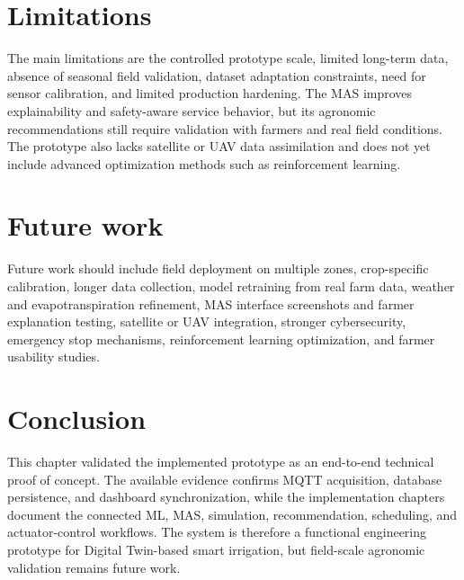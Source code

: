 \section{Limitations}

The main limitations are the controlled prototype scale, limited long-term data, absence of seasonal field validation, dataset adaptation constraints, need for sensor calibration, and limited production hardening. The MAS improves explainability and safety-aware service behavior, but its agronomic recommendations still require validation with farmers and real field conditions. The prototype also lacks satellite or UAV data assimilation and does not yet include advanced optimization methods such as reinforcement learning.

\section{Future work}

Future work should include field deployment on multiple zones, crop-specific calibration, longer data collection, model retraining from real farm data, weather and evapotranspiration refinement, MAS interface screenshots and farmer explanation testing, satellite or UAV integration, stronger cybersecurity, emergency stop mechanisms, reinforcement learning optimization, and farmer usability studies.

\section{Conclusion}

This chapter validated the implemented prototype as an end-to-end technical proof of concept. The available evidence confirms MQTT acquisition, database persistence, and dashboard synchronization, while the implementation chapters document the connected ML, MAS, simulation, recommendation, scheduling, and actuator-control workflows. The system is therefore a functional engineering prototype for Digital Twin-based smart irrigation, but field-scale agronomic validation remains future work.
